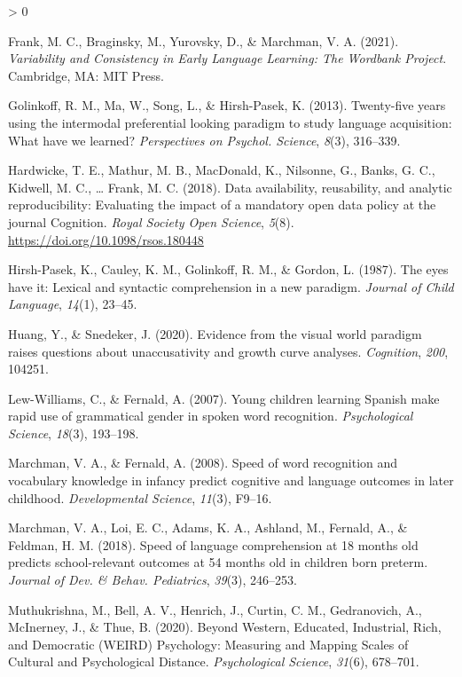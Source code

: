 \documentclass[
  english,
  man,floatsintext]{apa6}
\newlength{\cslhangindent}
\newenvironment{CSLReferences}[2] %
 {%
  \setlength{\parindent}{0pt}
  \ifodd #1 \everypar{\setlength{\hangindent}{\cslhangindent}}\ignorespaces\fi
  \ifnum #2 > 0
  \setlength{\parskip}{#2\baselineskip}
  \fi
 }%
 {}
\begin{document}
\begin{CSLReferences}{1}{0}
\leavevmode\hypertarget{ref-frank2021}{}%
Frank, M. C., Braginsky, M., Yurovsky, D., \& Marchman, V. A. (2021). \emph{{Variability and Consistency in Early Language Learning: The Wordbank Project}}. Cambridge, MA: MIT Press.

\leavevmode\hypertarget{ref-golinkoff2013}{}%
Golinkoff, R. M., Ma, W., Song, L., \& Hirsh-Pasek, K. (2013). {Twenty-five years using the intermodal preferential looking paradigm to study language acquisition: What have we learned?} \emph{Perspectives on Psychol. Science}, \emph{8}(3), 316--339.

\leavevmode\hypertarget{ref-hardwicke2018}{}%
Hardwicke, T. E., Mathur, M. B., MacDonald, K., Nilsonne, G., Banks, G. C., Kidwell, M. C., \ldots{} Frank, M. C. (2018). {Data availability, reusability, and analytic reproducibility: Evaluating the impact of a mandatory open data policy at the journal Cognition}. \emph{Royal Society Open Science}, \emph{5}(8). \url{https://doi.org/10.1098/rsos.180448}

\leavevmode\hypertarget{ref-hirshpasek1987}{}%
Hirsh-Pasek, K., Cauley, K. M., Golinkoff, R. M., \& Gordon, L. (1987). {The eyes have it: Lexical and syntactic comprehension in a new paradigm}. \emph{Journal of Child Language}, \emph{14}(1), 23--45.

\leavevmode\hypertarget{ref-huang2020}{}%
Huang, Y., \& Snedeker, J. (2020). {Evidence from the visual world paradigm raises questions about unaccusativity and growth curve analyses}. \emph{Cognition}, \emph{200}, 104251.

\leavevmode\hypertarget{ref-lewwilliams2007}{}%
Lew-Williams, C., \& Fernald, A. (2007). {Young children learning Spanish make rapid use of grammatical gender in spoken word recognition}. \emph{Psychological Science}, \emph{18}(3), 193--198.

\leavevmode\hypertarget{ref-marchman2008}{}%
Marchman, V. A., \& Fernald, A. (2008). {Speed of word recognition and vocabulary knowledge in infancy predict cognitive and language outcomes in later childhood.} \emph{Developmental Science}, \emph{11}(3), F9--16.

\leavevmode\hypertarget{ref-marchman2018}{}%
Marchman, V. A., Loi, E. C., Adams, K. A., Ashland, M., Fernald, A., \& Feldman, H. M. (2018). {Speed of language comprehension at 18 months old predicts school-relevant outcomes at 54 months old in children born preterm}. \emph{Journal of Dev. {\&} Behav. Pediatrics}, \emph{39}(3), 246--253.

\leavevmode\hypertarget{ref-muthukrishna2020}{}%
Muthukrishna, M., Bell, A. V., Henrich, J., Curtin, C. M., Gedranovich, A., McInerney, J., \& Thue, B. (2020). {Beyond Western, Educated, Industrial, Rich, and Democratic (WEIRD) Psychology: Measuring and Mapping Scales of Cultural and Psychological Distance}. \emph{Psychological Science}, \emph{31}(6), 678--701.


\end{CSLReferences}
\end{document}
